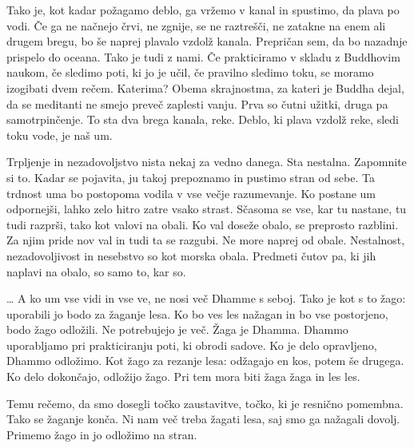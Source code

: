\clearpage

\enlargethispage{2\baselineskip}


Tako je, kot kadar požagamo deblo, ga vržemo v kanal in spustimo, da plava po vodi. Če ga ne načnejo črvi, ne zgnije, se ne raztrešči, ne zatakne na enem ali drugem bregu, bo še naprej plavalo vzdolž kanala. Prepričan sem, da bo nazadnje prispelo do oceana.
Tako je tudi z nami. Če prakticiramo v skladu z Buddhovim naukom, če sledimo poti, ki jo je učil, če pravilno sledimo toku, se moramo izogibati dvem rečem. Katerima? Obema skrajnostma, za kateri je Buddha dejal, da se meditanti ne smejo preveč zaplesti vanju. Prva so čutni užitki, druga pa samotrpinčenje. To sta dva brega kanala, reke. Deblo, ki plava vzdolž reke, sledi toku vode, je naš um.

\vspace{-\baselineskip}

Trpljenje in nezadovoljstvo nista nekaj za vedno danega. Sta nestalna. Zapomnite si to. Kadar se pojavita, ju takoj prepoznamo in pustimo stran od sebe. Ta trdnost uma bo postopoma vodila v vse večje razumevanje. Ko postane um odpornejši, lahko zelo hitro zatre vsako strast. Sčasoma se vse, kar tu nastane, tu tudi razprši, tako kot valovi na obali. Ko val doseže obalo, se preprosto razblini. Za njim pride nov val in tudi ta se razgubi. Ne more naprej od obale. Nestalnost, nezadovoljivost in nesebstvo so kot morska obala. Predmeti čutov pa, ki jih naplavi na obalo, so samo to, kar so.

\clearpage


\ldots{} A ko um vse vidi in vse ve, ne nosi več Dhamme s seboj. Tako je kot s to žago: uporabili jo bodo za žaganje lesa. Ko bo ves les nažagan in bo vse postorjeno, bodo žago odložili. Ne potrebujejo je več. Žaga je Dhamma. Dhammo uporabljamo pri prakticiranju poti, ki obrodi sadove. Ko je delo opravljeno, Dhammo odložimo. Kot žago za rezanje lesa: odžagajo en kos, potem še drugega. Ko delo dokončajo, odložijo žago. Pri tem mora biti žaga žaga in les les.

Temu rečemo, da smo dosegli točko zaustavitve, točko, ki je resnično pomembna. Tako se žaganje konča. Ni nam več treba žagati lesa, saj smo ga nažagali dovolj. Primemo žago in jo odložimo na stran.


